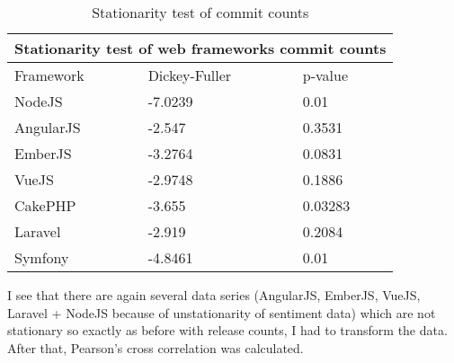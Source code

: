 \begin{table}[H]
\centering
\begin{tabular}{ |p{3cm}||p{3cm}|p{3cm}|  }
 \hline
 \multicolumn{3}{|c|}{Stationarity test of web frameworks commit counts} \\
 \hline
 Framework & Dickey-Fuller & p-value\\
 \hline
 NodeJS   & -7.0239    &0.01\\ \hline
 AngularJS &   -2.547  & 0.3531\\ \hline
 EmberJS & -3.2764 & 0.0831\\ \hline
 VueJS    &-2.9748 & 0.1886\\ \hline
 CakePHP&   -3.655  & 0.03283\\ \hline
 Laravel& -2.919  & 0.2084\\ \hline
 Symfony& -4.8461  & 0.01\\ \hline
\end{tabular}
\caption{Stationarity test of commit counts}
\label{table:stationarity_table_commits}
\end{table}

I see that there are again several data series (AngularJS, EmberJS, VueJS, Laravel + NodeJS because of unstationarity of sentiment data) which are not stationary so exactly as before with release counts, I had to transform the data. After that, Pearson's cross correlation was calculated.